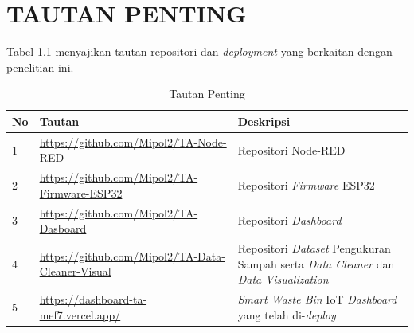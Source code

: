 \chapter{TAUTAN PENTING}
\label{chap:lampiran-a}

Tabel \ref{tab:tautan-penting} menyajikan tautan repositori dan \textit{deployment} yang berkaitan dengan penelitian ini.

\begin{table}[H]
  \caption{Tautan Penting}
  \label{tab:tautan-penting}
  \begin{tabularx}{\textwidth}{| l | X | X |}
    \hline
    \textbf{No} & \textbf{Tautan} & \textbf{Deskripsi} \\
    \hline
    1 & \url{https://github.com/Mipol2/TA-Node-RED} & Repositori Node-RED \\
    \hline
    2 & \url{https://github.com/Mipol2/TA-Firmware-ESP32} & Repositori \textit{Firmware} ESP32 \\
    \hline
    3 & \url{https://github.com/Mipol2/TA-Dasboard} & Repositori \textit{Dashboard} \\
    \hline
    4 & \url{https://github.com/Mipol2/TA-Data-Cleaner-Visual} & Repositori \textit{Dataset} Pengukuran Sampah serta \textit{Data Cleaner} dan \textit{Data Visualization} \\
    \hline
    5 & \url{https://dashboard-ta-mef7.vercel.app/} & \textit{Smart Waste Bin} IoT \textit{Dashboard} yang telah di-\textit{deploy} \\
    \hline
  \end{tabularx}
\end{table}